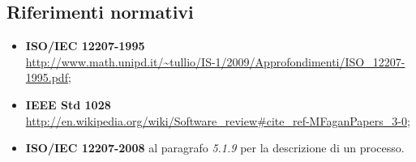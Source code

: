 \subsection{Riferimenti normativi}
\begin{itemize}
	\item \textbf{ISO/IEC 12207-1995} \\ \url{http://www.math.unipd.it/~tullio/IS-1/2009/Approfondimenti/ISO_12207-1995.pdf}; \\
	\item \textbf{IEEE Std 1028} \\ \url{http://en.wikipedia.org/wiki/Software_review#cite_ref-MFaganPapers_3-0}; \\
	\item \textbf{ISO/IEC 12207-2008} al paragrafo \emph{5.1.9} per la descrizione di un processo.
\end{itemize}




